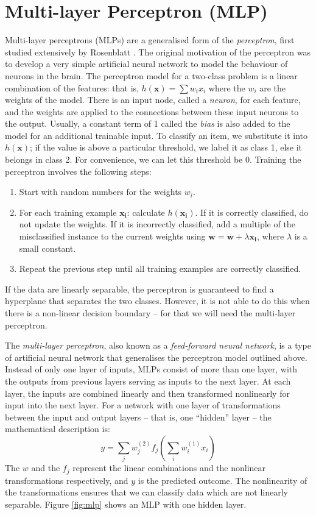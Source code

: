 \section{Multi-layer Perceptron (MLP)}
Multi-layer perceptrons (MLPs) are a generalised form of the
\textit{perceptron}, first
studied extensively by Rosenblatt . The original
motivation of the perceptron 
was to develop a very simple artificial neural network to model the
behaviour of neurons in the brain. The perceptron model for a two-class
problem is a linear combination of the features: that is,
$h(\mathbf{x}) = \sum w_i x_i$ where the $w_i$ are the weights of the model.
There is an input node, called a \textit{neuron}, for each feature, and the
weights are applied to the connections between these input neurons to the
output.
Usually, a constant term of 1 called the \textit{bias} is also added to the
model for an additional trainable input. To classify an item, we substitute it
into $h(\mathbf{x})$; if the value is above a particular threshold, we label it
as class 1, else it belongs in class 2. For convenience, we can let this
threshold be 0. Training the perceptron involves the following steps:
\begin{enumerate}
\item Start with random numbers for the weights $w_i$.
\item For each training example $\mathbf{x_i}$: calculate $h(\mathbf{x_i})$.
If it is correctly classified, do not update the weights.
If it is incorrectly classified, add a multiple of the misclassified
instance to the current weights using
$\mathbf{w} = \mathbf{w} + \lambda \mathbf{x_i}$, where $\lambda$ is a small
constant.
\item Repeat the previous step until all training examples are correctly
classified.
\end{enumerate}
If the data are linearly separable, the perceptron is guaranteed to find a
hyperplane that separates the two classes. However, it is not able to do this
when there is a non-linear decision boundary -- for that we will need the
multi-layer perceptron.

The \textit{multi-layer perceptron}, also known as a
\textit{feed-forward neural network}, is a type of artificial neural network
that generalises the perceptron model outlined above. Instead of only one layer
of inputs, MLPs consist of more than one layer, with the outputs from previous
layers serving as inputs to the next layer. At each layer, the inputs are
combined linearly and then transformed nonlinearly for input into the next
layer. For a network with one layer of transformations between the input and
output layers -- that is, one ``hidden'' layer -- the mathematical description
is:
\begin{equation*}
y = \sum_j w^{(2)}_j f_j \left(\sum_i w^{(1)}_i x_i\right)
\end{equation*}
The $w$ and the $f_j$ represent the linear combinations and the nonlinear
transformations respectively, and $y$ is the predicted outcome.
The nonlinearity of the transformations ensures
that we can classify data which are not linearly separable. Figure
\ref{fig:mlp} shows an MLP with one hidden layer.

